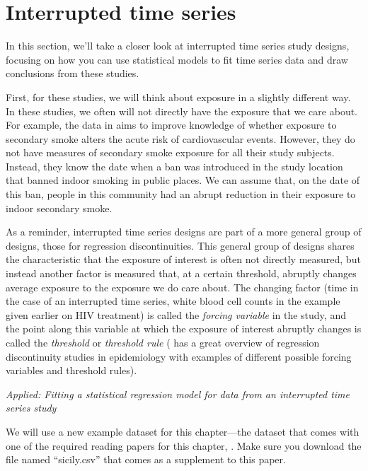 \documentclass[
]{book}
\begin{document}
\hypertarget{interrupted-time-series}{%
\section{Interrupted time series}\label{interrupted-time-series}}

In this section, we'll take a closer look at interrupted time series study designs, focusing on how you can use statistical models to fit time series data and draw conclusions from these studies.

First, for these studies, we will think about exposure in a slightly different way. In these studies, we often will not directly have the exposure that we care about. For example, the data in \citet{bernal2017interrupted} aims to improve knowledge of whether exposure to secondary smoke alters the acute risk of cardiovascular events. However, they do not have measures of secondary smoke exposure for all their study subjects. Instead, they know the date when a ban was introduced in the study location that banned indoor smoking in public places. We can assume that, on the date of this ban, people in this community had an abrupt reduction in their exposure to indoor secondary smoke.

As a reminder, interrupted time series designs are part of a more general group of designs, those for regression discontinuities. This general group of designs shares the characteristic that the exposure of interest is often not directly measured, but instead another factor is measured that, at a certain threshold, abruptly changes average exposure to the exposure we do care about. The changing factor (time in the case of an interrupted time series, white blood cell counts in the example given earlier on HIV treatment) is called the \emph{forcing variable} in the study, and the point along this variable at which the exposure of interest abruptly changes is called the \emph{threshold} or \emph{threshold rule} (\citep{bor2014regression} has a great overview of regression discontinuity studies in epidemiology with examples of different possible forcing variables and threshold rules).

\emph{Applied: Fitting a statistical regression model for data from an interrupted time series study}

We will use a new example dataset for this chapter---the dataset that comes with one of the required reading papers for this chapter, \citet{bernal2017interrupted}. Make sure you download the file named ``sicily.csv'' that comes as a supplement to this paper.
\end{document}
